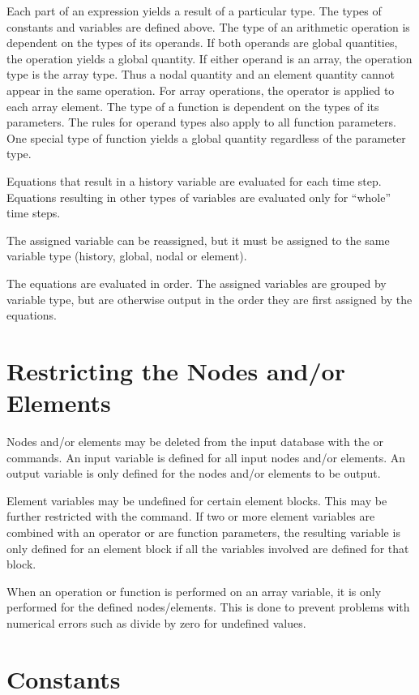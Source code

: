 Each part of an expression yields a result of a particular type. The
types of constants and variables are defined above. The type of an
arithmetic operation is dependent on the types of its operands. If both
operands are global quantities, the operation yields a global
quantity. If either operand is an array, the operation type is
the array type. Thus a nodal quantity and an element quantity cannot
appear in the same operation. For array operations, the operator is
applied to each array element. The type of a function is dependent on
the types of its parameters. The rules for operand types also apply to
all function parameters. One special type of function yields a global
quantity regardless of the parameter type.

Equations that result in a history variable are evaluated for each time
step. Equations resulting in other types of variables are evaluated only
for ``whole'' time steps.

The assigned variable can be reassigned, but it must be assigned to the
same variable type (history, global, nodal or element).

The equations are evaluated in order. The assigned variables are grouped
by variable type, but are otherwise output in the order they are first
assigned by the equations.

\section{Restricting the Nodes and/or Elements}

Nodes and/or elements may be deleted from the input database with the
 or  commands. An input variable is defined for
all input nodes and/or elements. An output variable is only defined for
the nodes and/or elements to be output.

Element variables may be undefined for certain element blocks. This may
be further restricted with the  command. If two or more
element variables are combined with an operator or are function
parameters, the resulting variable is only defined for an element block
if all the variables involved are defined for that block.

When an operation or function is performed on an array variable, it is
only performed for the defined nodes/elements. This is done to prevent
problems with numerical errors such as divide by zero for undefined
values.

\section{Constants}

